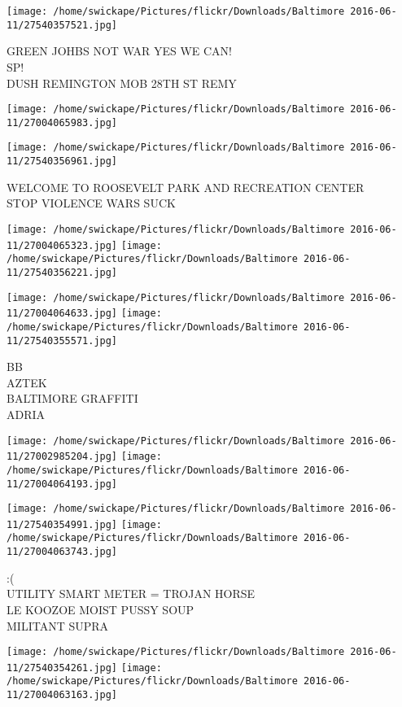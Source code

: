 \documentclass[10pt,letterpaper]{article}
\begin{document}
\texttt{[image: /home/swickape/Pictures/flickr/Downloads/Baltimore 2016-06-11/27540357521.jpg]}

GREEN JOHBS NOT WAR YES WE CAN!\\
SP!\\
DUSH REMINGTON MOB 28TH ST REMY
\pagebreak

\texttt{[image: /home/swickape/Pictures/flickr/Downloads/Baltimore 2016-06-11/27004065983.jpg]}

\vspace{0.25in}
\texttt{[image: /home/swickape/Pictures/flickr/Downloads/Baltimore 2016-06-11/27540356961.jpg]}

WELCOME TO ROOSEVELT PARK AND RECREATION CENTER\\
STOP VIOLENCE WARS SUCK
\pagebreak

\texttt{[image: /home/swickape/Pictures/flickr/Downloads/Baltimore 2016-06-11/27004065323.jpg]}
\texttt{[image: /home/swickape/Pictures/flickr/Downloads/Baltimore 2016-06-11/27540356221.jpg]}

\texttt{[image: /home/swickape/Pictures/flickr/Downloads/Baltimore 2016-06-11/27004064633.jpg]}
\texttt{[image: /home/swickape/Pictures/flickr/Downloads/Baltimore 2016-06-11/27540355571.jpg]}

BB\\
AZTEK\\
BALTIMORE GRAFFITI\\
ADRIA
\pagebreak

\texttt{[image: /home/swickape/Pictures/flickr/Downloads/Baltimore 2016-06-11/27002985204.jpg]}
\texttt{[image: /home/swickape/Pictures/flickr/Downloads/Baltimore 2016-06-11/27004064193.jpg]}

\texttt{[image: /home/swickape/Pictures/flickr/Downloads/Baltimore 2016-06-11/27540354991.jpg]}
\texttt{[image: /home/swickape/Pictures/flickr/Downloads/Baltimore 2016-06-11/27004063743.jpg]}

:(\\
UTILITY SMART METER = TROJAN HORSE\\
LE KOOZOE MOIST PUSSY SOUP\\
MILITANT SUPRA
\pagebreak

\texttt{[image: /home/swickape/Pictures/flickr/Downloads/Baltimore 2016-06-11/27540354261.jpg]}
\texttt{[image: /home/swickape/Pictures/flickr/Downloads/Baltimore 2016-06-11/27004063163.jpg]}
\end{document}
